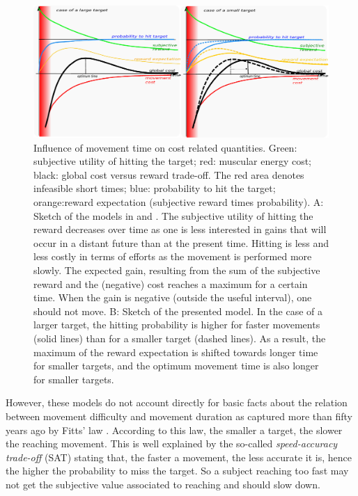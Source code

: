 \documentclass[pdftex,a4paper,11pt]{report}
\begin{document}
\begin{figure}[hbt]
\centering
	\includegraphics[width=1.0\columnwidth]{images/canu_fig3.pdf}
\caption{Influence of movement time on cost related quantities.
Green: subjective utility of hitting the target; red: muscular energy cost; black: global cost versus reward trade-off. The red area denotes infeasible short times; blue: probability to hit the target; orange:reward expectation (subjective reward times probability).
 A: Sketch of the models in \cite{shadmehr10} and \cite{rigoux12}.
The subjective utility of hitting the reward decreases over time as one is less interested in gains that will occur in a distant future than at the present time. Hitting is less and less costly in terms of efforts as the movement is performed more slowly.
The expected gain, resulting from the sum of the subjective reward and the (negative) cost reaches a maximum for a certain time. When the gain is negative (outside the useful interval), one should not move.
B: Sketch of the presented model.
In the case of a larger target, the hitting probability is higher for faster movements (solid lines) than for a smaller target (dashed lines). As a result, the maximum of the reward expectation is shifted towards longer time for smaller targets, and the optimum movement time is also longer for smaller targets.\label{fig:mvt_acc}}
\end{figure}

However, these models do not account directly for basic facts about the relation between movement difficulty and movement duration as captured more than fifty years ago by Fitts' law \cite{fitts54_JEP}.
According to this law, the smaller a target, the slower the reaching movement. 
This is well explained by the so-called {\em speed-accuracy trade-off} (SAT) stating that, the faster a movement, the less accurate it is, hence the higher the probability to miss the target. So a subject reaching too fast may not get the subjective value associated to reaching and should slow down.
\end{document}
